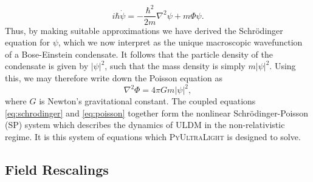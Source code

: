 \documentclass[a4paper,11pt]{article}
\newcommand{\PyUltraLight}{\textsc{PyUltraLight}\xspace}
\begin{document}
\begin{equation}\label{eq:schrodinger}
    i\hbar\Dot{\psi}=-\frac{\hbar^2}{2m}\nabla^2\psi+m\Phi\psi.
\end{equation}
Thus, by making suitable approximations we have derived the Schr{\"o}dinger equation for $\psi$, which we now interpret as the unique macroscopic wavefunction of a Bose-Einstein condensate. It follows that the particle density of the condensate is given by $\vert\psi\vert^2$, such that the mass density is simply $m\vert\psi\vert^2$. Using this, we may therefore write down the Poisson equation as
\begin{equation}\label{eq:poisson}
    \nabla^2\Phi=4\pi G m \vert\psi\vert^2,
\end{equation}
where $G$ is Newton's gravitational constant. The coupled equations \ref{eq:schrodinger} and \ref{eq:poisson} together form the nonlinear Schr{\"o}dinger-Poisson (SP) system which describes the dynamics of ULDM in the non-relativistic regime. It is this system of equations which \PyUltraLight is designed to solve.


\subsection{Field Rescalings}
\end{document}
